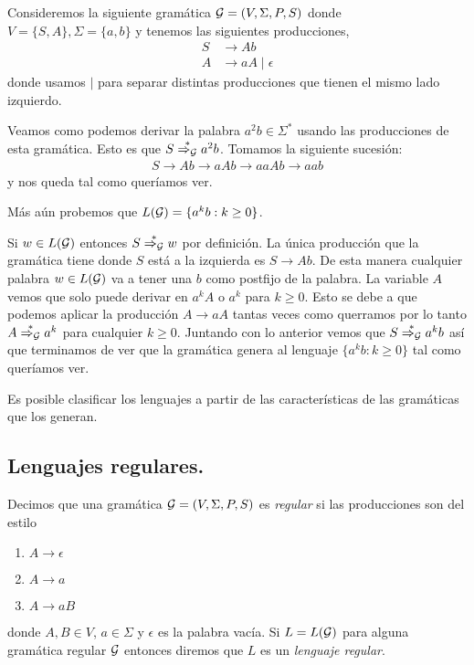 \documentclass[tesis.tex]{subfiles}
\begin{document}
\medskip
\begin{ej}\label{gramatica-regular}
	Consideremos la siguiente gramática ${\cal G} = (V, \Sigma, P, S)$ donde $V = \{ S, A \}, \Sigma = \{ a,b \}$ y tenemos las siguientes producciones,
	\begin{align*}
		S & \to Ab \\
		A & \to aA \mid \epsilon 
	\end{align*}
	donde usamos $\mid$ para separar distintas producciones que tienen el mismo lado izquierdo.
	
	Veamos como podemos derivar la palabra $a^2b \in \Sigma^*$ usando las producciones de esta gramática. 
	Esto es que $S \overset{*}{\Rightarrow_{\cal G}} a^2b$.
	Tomamos la siguiente sucesión:
	\begin{align*}
		S \to Ab \to aAb \to aaAb \to aab
	\end{align*} 
	y nos queda tal como queríamos ver.
	
	Más aún probemos que $L({\cal G}) = \{ a^{k}b : k \ge 0 \}$. 
	
	Si $w \in L(\cal G)$ entonces $S \overset{*}{\Rightarrow_{\cal G}} w$ por definición. 
	La única producción que la gramática tiene donde $S$ está a la izquierda es $S \to Ab$. 
	De esta manera cualquier palabra $w \in L(\cal G)$ va a tener una $b$ como postfijo de la palabra. 
	La variable $A$ vemos que solo puede derivar en $a^{k}A$ o $a^{k}$ para $k \ge 0$.
	Esto se debe a que podemos aplicar la producción $A \to aA$ tantas veces como querramos por lo tanto $A \overset{*}{\Rightarrow_{\cal G}} a^k$ para cualquier $k \ge 0$.
	Juntando con lo anterior vemos que $S \overset{*}{\Rightarrow_{\cal G}} a^{k}b$ así que terminamos de ver que la gramática genera al lenguaje $\{a^kb : k \ge 0\}$ tal como queríamos ver.
\end{ej}



Es posible clasificar los lenguajes a partir de las características de las gramáticas que los generan. 

\subsection{Lenguajes regulares.}

\begin{deff}
	Decimos que una gramática ${\cal G} = (V, \Sigma, P, S)$ es \emph{regular} si las producciones son del estilo
	\begin{enumerate}
		\item $A \to \epsilon$
		\item $A \to a$
		\item $A \to a B$
	\end{enumerate}
	donde $A, B \in V$, $a \in \Sigma$ y $\epsilon$ es la palabra vacía. 
	Si $L=L({\cal G})$ para alguna gramática regular $\cal G$ entonces diremos que $L$ es un \emph{lenguaje regular}. 
\end{deff}
\end{document}
